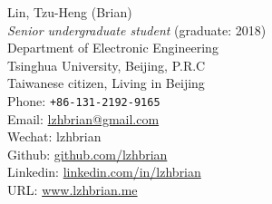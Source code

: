 \documentclass[11pt, a4paper]{article} %
\begin{document}

{\LARGE Lin, Tzu-Heng (Brian)}\\[0.4cm] %
\emph{Senior undergraduate student} (graduate: 2018)\\
Department of Electronic Engineering\\
Tsinghua University, Beijing, P.R.C\\%
Taiwanese citizen, Living in Beijing\\[1cm] 
Phone: \texttt{+86-131-2192-9165}\\ %
Email: \href{mailto:lzhbrian@gmail.com}{lzhbrian@gmail.com}\\ %
Wechat: lzhbrian\\
Github: \href{http://www.github.com/lzhbrian}{github.com/lzhbrian}\\
Linkedin: \href{http://www.linkedin.com/in/lzhbrian}{linkedin.com/in/lzhbrian}\\
\textsc{URL}: \href{http://www.lzhbrian.me}{www.lzhbrian.me}\\ %






\end{document}
